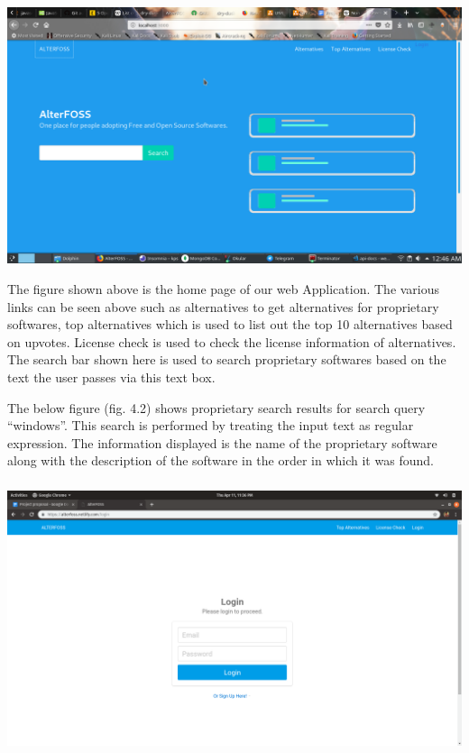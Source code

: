 \begin{center}
\includegraphics[scale=0.45]{images/4-1.png}
\end{center}


The figure shown above is the home page of our web Application. The various links can be seen above such as alternatives to get alternatives for proprietary softwares, top alternatives which is used to list out the top 10 alternatives based on upvotes. License check is used to check the license information of alternatives. The search bar shown here is used to search proprietary softwares based on the text the user passes via this text box.

The below figure (fig. 4.2) shows proprietary search results for search query “windows”. This search is performed by treating the input text as regular expression. The information displayed is the name of the proprietary software along with the description of the software in the order in which it was found.

\subsubsection{}
\begin{center}
\includegraphics[scale=0.29]{images/login.png}
\end{center}


